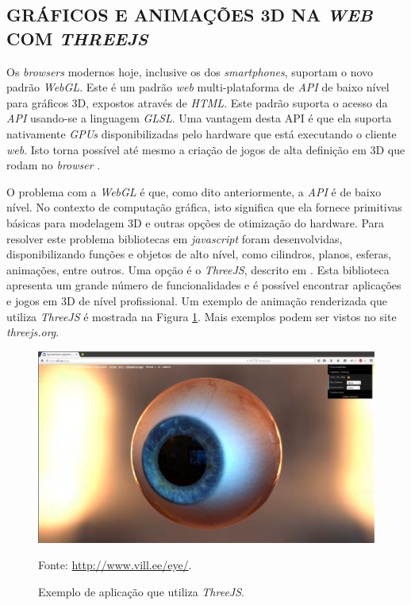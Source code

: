 \subsection{GRÁFICOS E ANIMAÇÕES 3D NA \emph{WEB} COM \emph{THREEJS}} 
\label{threejs_sec}
Os \emph{browsers} modernos hoje, inclusive os dos \emph{smartphones}, suportam o novo padrão \emph{WebGL}. 
Este é um padrão \emph{web} multi-plataforma de \emph{API} de baixo nível para gráficos 3D, expostos através de \emph{HTML}. 
Este padrão suporta o acesso da \emph{API} usando-se a linguagem \emph{GLSL}. 
Uma vantagem desta API é que ela suporta nativamente \emph{GPUs} disponibilizadas pelo hardware que está executando o cliente \emph{web}. 
Isto torna possível até mesmo a criação de jogos de alta definição em 3D que rodam no \emph{browser} \cite{Matsuda2013}.

O problema com a \emph{WebGL} é que, como dito anteriormente, a \emph{API} é de baixo nível. 
No contexto de computação gráfica, isto significa que ela fornece primitivas básicas para modelagem 3D e outras opções de otimização do hardware.
Para resolver este problema bibliotecas em \emph{javascript} foram desenvolvidas, disponibilizando funções e objetos de alto nível, como cilindros, planos, esferas, animações, entre outros. 
Uma opção é o \emph{ThreeJS}, descrito em . 
Esta biblioteca apresenta um grande número de funcionalidades e é possível encontrar aplicações e jogos em 3D de nível profissional. 
Um exemplo de animação renderizada que utiliza \emph{ThreeJS} é mostrada na Figura \ref{evil_eye}.
Mais exemplos podem ser vistos no site \emph{threejs.org}.



\begin{figure}[H]
	\centering
	\includegraphics[width=14cm]{figuras/evil_eye.eps}
	\caption{Exemplo de aplicação que utiliza \emph{ThreeJS}.}
	\label{evil_eye}
	\footnotesize Fonte: \url{http://www.vill.ee/eye/}.
\end{figure}


